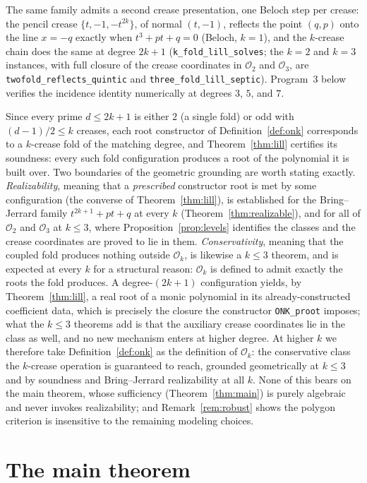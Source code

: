 \documentclass[11pt]{amsart}
\theoremstyle{plain}
\theoremstyle{definition}
\newcommand{\Ok}{\mathscr{O}_k}
\newcommand{\Onum}[1]{\mathscr{O}_{#1}}
\newcommand{\code}[1]{\texttt{#1}}
\begin{document}
The same family admits a second crease presentation, one Beloch step per crease: the pencil crease $\{t,-1,-t^{2k}\}$, of normal $(t,-1)$, reflects the point $(q,p)$ onto the line $x=-q$ exactly when $t^3 + pt + q = 0$ (Beloch, $k=1$), and the $k$-crease chain does the same at degree $2k+1$ (\code{k\_fold\_lill\_solves}; the $k=2$ and $k=3$ instances, with full closure of the crease coordinates in $\Onum{2}$ and $\Onum{3}$, are \code{twofold\_reflects\_quintic} and \code{three\_fold\_lill\_septic}). Program~3 below verifies the incidence identity numerically at degrees $3$, $5$, and $7$.

Since every prime $d \le 2k+1$ is either $2$ (a single fold) or odd with $(d-1)/2 \le k$ creases, each root constructor of Definition~\ref{def:onk} corresponds to a $k$-crease fold of the matching degree, and Theorem~\ref{thm:lill} certifies its soundness: every such fold configuration produces a root of the polynomial it is built over. Two boundaries of the geometric grounding are worth stating exactly. \emph{Realizability}, meaning that a \emph{prescribed} constructor root is met by some configuration (the converse of Theorem~\ref{thm:lill}), is established for the Bring--Jerrard family $t^{2k+1}+pt+q$ at every $k$ (Theorem~\ref{thm:realizable}), and for all of $\Onum{2}$ and $\Onum{3}$ at $k \le 3$, where Proposition~\ref{prop:levels} identifies the classes and the crease coordinates are proved to lie in them. \emph{Conservativity}, meaning that the coupled fold produces nothing outside $\Ok$, is likewise a $k \le 3$ theorem, and is expected at every $k$ for a structural reason: $\Ok$ is defined to admit exactly the roots the fold produces. A degree-$(2k+1)$ configuration yields, by Theorem~\ref{thm:lill}, a real root of a monic polynomial in its already-constructed coefficient data, which is precisely the closure the constructor \code{ONK\_proot} imposes; what the $k \le 3$ theorems add is that the auxiliary crease coordinates lie in the class as well, and no new mechanism enters at higher degree. At higher $k$ we therefore take Definition~\ref{def:onk} as the definition of $\Ok$: the conservative class the $k$-crease operation is guaranteed to reach, grounded geometrically at $k \le 3$ and by soundness and Bring--Jerrard realizability at all $k$. None of this bears on the main theorem, whose sufficiency (Theorem~\ref{thm:main}) is purely algebraic and never invokes realizability; and Remark~\ref{rem:robust} shows the polygon criterion is insensitive to the remaining modeling choices.

\section{The main theorem}
\end{document}
